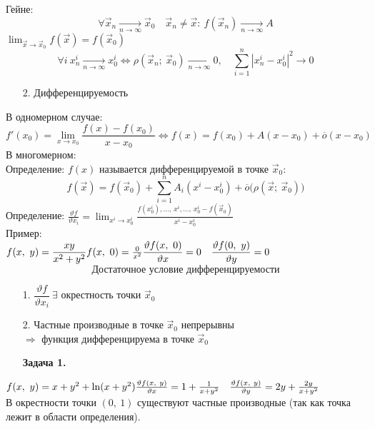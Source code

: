\documentclass[12pt, letterpaper, twoside]{article}
\newcommand{\DS}{\displaystyle}
\newcommand{\oo}{\infty}
\newcommand{\Abs}[1]{\left| #1 \right|}
\begin{document}
    Гейне:
    \[\forall \vec{x}_n\xrightarrow[n\to \oo]{} \vec{x}_0\quad \vec{x}_n \neq \vec{x}:\ f(\vec{x}_n)\xrightarrow[n\to\oo]{} A\]
    $\DS \lim_{\vec{x}\to \vec{x}_0} f(\vec{x}) = f(\vec{x}_0)$
    \[\forall i\ x_n^i\xrightarrow[n\to\oo]{} x_0^i \Leftrightarrow \rho(\vec{x}_n;\ \vec{x}_0)\xrightarrow[n\to\oo]{} 0,\quad \sum_{i = 1}^{n} \Abs{x^i_n - x^i_0}^2\to 0\]
    \begin{enumerate}
        \item[2.] Дифференцируемость
    \end{enumerate}
    В одномерном случае:
    \[f'(x_0) = \lim_{x\to x_0} \frac{f(x) - f(x_0)}{x - x_0} \Leftrightarrow f(x) = f(x_0) + A(x - x_0) + \overline{o}(x - x_0)\]
    В многомерном:\\
    Определение: $f(x)$ называется дифференцируемой в точке $\vec{x}_0$:
    \[f(\vec{x}) = f(\vec{x}_0) + \sum_{i = 1}^{n} A_i(x^i - x_0^i) + \overline{o}\big(\rho(\vec{x};\ \vec{x}_0)\big)\]
    Определение: $\DS\frac{\vartheta f}{\vartheta x_i} = \lim_{x^i\to x^i_0} \frac{f(x_0^i),\dots,\ x^i,\dots,\ x_0^i - f(\vec{x}_0)}{x^i - x^i_0}$\\
    Пример:\\
    $f(x,\ y) = \dfrac{xy}{x^2 + y^2}\\
    f(x,\ 0) = \frac{0}{x^2}\\
    \dfrac{\vartheta f(x,\ 0)}{\vartheta x} = 0\quad \dfrac{\vartheta f(0,\ y)}{\vartheta y} = 0$
    \[\text{Достаточное условие дифференцируемости}\]
    \begin{enumerate}
        \item[1.] $\dfrac{\vartheta f}{\vartheta x_i}\ \exists$ окрестность точки $\vec{x}_0$
        \item[2.] Частные производные в точке $\vec{x}_0$ непрерывны\\
        $\Rightarrow$ функция дифференцируема в точке $\vec{x}_0$
    \end{enumerate}
    \begin{enumerate}
        \item[\textbf{Задача 1.}]
    \end{enumerate}
    $f(x,\ y) = x + y^2 + \ln(x + y^2)\\
    \frac{\vartheta f(x,\ y)}{\vartheta x} = 1 + \frac{1}{x + y^2}\quad \frac{\vartheta f(x,\ y)}{\vartheta y} = 2y + \frac{2y}{x + y^2}$\\
    В окрестности точки $(0,\ 1)$ существуют частные производные (так как точка лежит в области определения).\\
\end{document}
